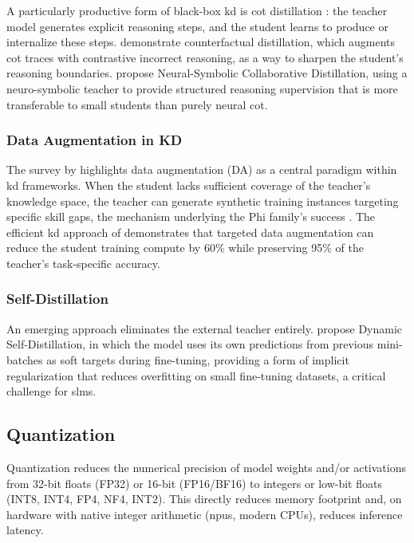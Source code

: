 A particularly productive form of black-box \gls{kd} is \gls{cot} distillation \citep{wei2022cot}: the teacher model generates explicit reasoning steps, and the student learns to produce or internalize these steps. \citet{feng2024counterfactual} demonstrate counterfactual distillation, which augments \gls{cot} traces with contrastive incorrect reasoning, as a way to sharpen the student's reasoning boundaries. \citet{liao2024nesycd} propose Neural-Symbolic Collaborative Distillation, using a neuro-symbolic teacher to provide structured reasoning supervision that is more transferable to small students than purely neural \gls{cot}.

\subsubsection{Data Augmentation in KD}

The survey by \citet{xu2024kd_survey} highlights data augmentation (DA) as a central paradigm within \gls{kd} frameworks. When the student lacks sufficient coverage of the teacher's knowledge space, the teacher can generate synthetic training instances targeting specific skill gaps, the mechanism underlying the Phi family's success \citep{gunasekar2023phi1}. The efficient \gls{kd} approach of \citet{ballout2024efficient_kd} demonstrates that targeted data augmentation can reduce the student training compute by 60\% while preserving 95\% of the teacher's task-specific accuracy.

\subsubsection{Self-Distillation}

An emerging approach eliminates the external teacher entirely. \citet{fu2024dynamic_selfd} propose Dynamic Self-Distillation, in which the model uses its own predictions from previous mini-batches as soft targets during fine-tuning, providing a form of implicit regularization that reduces overfitting on small fine-tuning datasets, a critical challenge for \glspl{slm}.

\subsection{Quantization}
\label{subsec:compression_quantization}

Quantization reduces the numerical precision of model weights and/or activations from 32-bit floats (FP32) or 16-bit (FP16/BF16) to integers or low-bit floats (INT8, INT4, FP4, NF4, INT2). This directly reduces memory footprint and, on hardware with native integer arithmetic (\glspl{npu}, modern CPUs), reduces inference latency.

